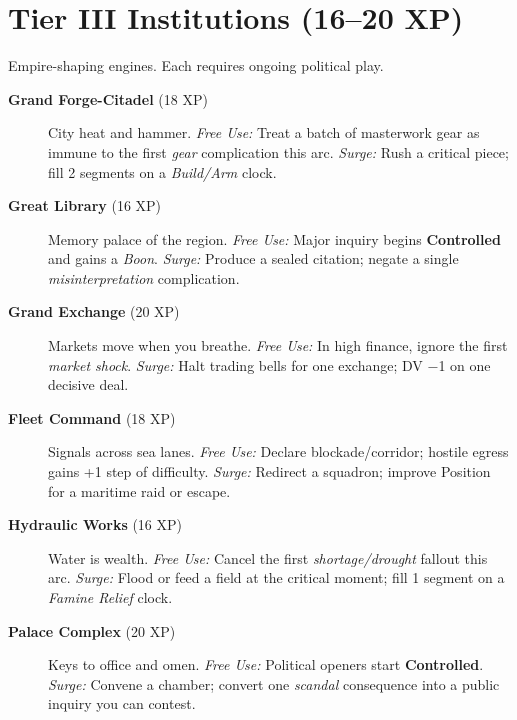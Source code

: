 \section{Tier III Institutions (16–20 XP)}
Empire-shaping engines. Each requires ongoing political play.
\begin{description}
  \item[\textbf{Grand Forge-Citadel} (18 XP)]  City heat and hammer. \emph{Free Use:} Treat a batch of masterwork gear as immune to the first \emph{gear} complication this arc. \emph{Surge:} Rush a critical piece; fill 2 segments on a \emph{Build/Arm} clock.
  \item[\textbf{Great Library} (16 XP)]  Memory palace of the region. \emph{Free Use:} Major inquiry begins \textbf{Controlled} and gains a \emph{Boon}. \emph{Surge:} Produce a sealed citation; negate a single \emph{misinterpretation} complication.
  \item[\textbf{Grand Exchange} (20 XP)]  Markets move when you breathe. \emph{Free Use:} In high finance, ignore the first \emph{market shock}. \emph{Surge:} Halt trading bells for one exchange; DV −1 on one decisive deal.
  \item[\textbf{Fleet Command} (18 XP)]  Signals across sea lanes. \emph{Free Use:} Declare blockade/corridor; hostile egress gains +1 step of difficulty. \emph{Surge:} Redirect a squadron; improve Position for a maritime raid or escape.
  \item[\textbf{Hydraulic Works} (16 XP)]  Water is wealth. \emph{Free Use:} Cancel the first \emph{shortage/drought} fallout this arc. \emph{Surge:} Flood or feed a field at the critical moment; fill 1 segment on a \emph{Famine Relief} clock.
  \item[\textbf{Palace Complex} (20 XP)]  Keys to office and omen. \emph{Free Use:} Political openers start \textbf{Controlled}. \emph{Surge:} Convene a chamber; convert one \emph{scandal} consequence into a public inquiry you can contest.
\end{description}

